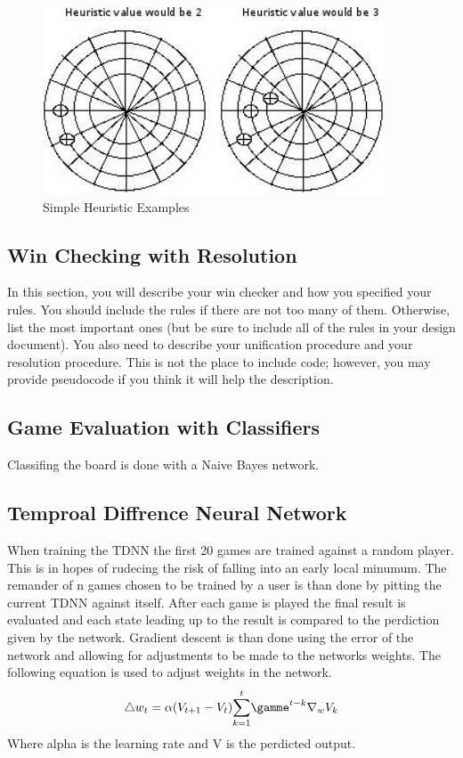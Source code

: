 \documentclass[12pt,letterpaper]{article}
\begin{document}
\begin{figure}
\begin{center}
\includegraphics[width=4in]{heu.png}
\end{center}
\caption{Simple Heuristic Examples}
\label{somefigure}
\end{figure}

\subsection{Win Checking with Resolution}
In this section, you will describe your win checker and how you specified your rules. 
You should include the rules if there are not too many of them. Otherwise, list the most important
ones (but be sure to include all of the rules in your design document). You also need to describe 
your unification procedure and your resolution procedure. This is not the place to include code; 
however, you may provide pseudocode if you think it will help the description.

\subsection{Game Evaluation with Classifiers}
Classifing the board is done with a Naive Bayes network. 

\subsection{Temproal Diffrence Neural Network}
When training the TDNN the first 20 games are trained against a random player. This is in hopes of rudecing the risk of falling into an early local minumum. The remander of n games chosen to be trained by a user is than done by pitting the current TDNN against itself. After each game is played the final result is evaluated and each state leading up to the result is compared to the perdiction given by the network. Gradient descent is than done using the error of the network and allowing for adjustments to be made to the networks weights. The following equation is used to adjust weights in the network. 
\[
{\triangle} w_t = \alpha (V _{t + 1} - V _t)  \overset{t}{\sum_{k = 1}} {\gamme}^{t - k} {\nabla}_w V_k
\]
Where alpha is the learning rate and V is the perdicted output.
\end{document}
